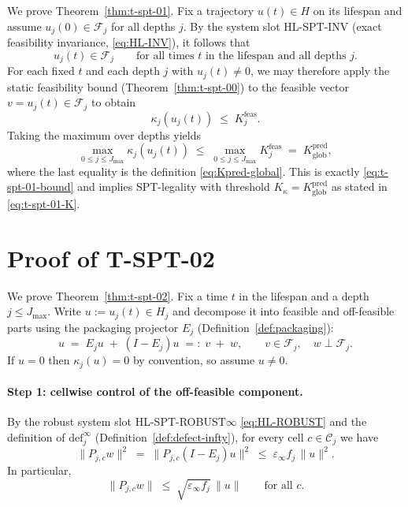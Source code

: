 \documentclass[11pt]{article}
\begin{document}
We prove Theorem~\ref{thm:t-spt-01}.
Fix a trajectory $u(t)\in H$ on its lifespan and assume $u_j(0)\in\mathcal{F}_j$ for all depths $j$.
By the system slot HL-SPT-INV (exact feasibility invariance, \eqref{eq:HL-INV}), it follows that
\[
u_j(t)\in \mathcal{F}_j \qquad \text{for all times $t$ in the lifespan and all depths $j$.}
\]
For each fixed $t$ and each depth $j$ with $u_j(t)\neq 0$, we may therefore apply the static feasibility bound (Theorem~\ref{thm:t-spt-00}) to the feasible vector $v=u_j(t)\in\mathcal{F}_j$ to obtain
\[
\kappa_j(u_j(t)) \;\le\; K^{\mathrm{feas}}_j.
\]
Taking the maximum over depths yields
\[
\max_{0\le j\le J_{\max}}\kappa_j(u_j(t))
\;\le\;
\max_{0\le j\le J_{\max}} K^{\mathrm{feas}}_j
\;=\;
K^{\mathrm{pred}}_{\mathrm{glob}},
\]
where the last equality is the definition \eqref{eq:Kpred-global}.
This is exactly \eqref{eq:t-spt-01-bound} and implies SPT-legality with threshold $K_\kappa=K^{\mathrm{pred}}_{\mathrm{glob}}$ as stated in \eqref{eq:t-spt-01-K}.
 \section{Proof of T-SPT-02}\label{sec:proof-t-spt-02}

We prove Theorem~\ref{thm:t-spt-02}.
Fix a time $t$ in the lifespan and a depth $j\le J_{\max}$.
Write $u:=u_j(t)\in H_j$ and decompose it into feasible and off-feasible parts using the packaging projector $E_j$ (Definition~\ref{def:packaging}):
\[
u \;=\; E_j u \;+\; (I-E_j)u \;=:\; v \;+\; w,
\qquad v\in\mathcal{F}_j,\quad w\perp \mathcal{F}_j.
\]
If $u=0$ then $\kappa_j(u)=0$ by convention, so assume $u\neq 0$.

\paragraph{Step 1: cellwise control of the off-feasible component.}
By the robust system slot HL-SPT-ROBUST$\infty$ \eqref{eq:HL-ROBUST} and the definition of $\mathrm{def}^\infty_j$ (Definition~\ref{def:defect-infty}),
for every cell $c\in\mathcal{C}_j$ we have
\begin{equation}\label{eq:proof-robust-cellwise}
\|P_{j,c}w\|^2
\;=\;
\|P_{j,c}(I-E_j)u\|^2
\;\le\;
\varepsilon_\infty f_j \,\|u\|^2.
\end{equation}
In particular,
\begin{equation}\label{eq:proof-robust-cellwise-sqrt}
\|P_{j,c}w\|
\;\le\;
\sqrt{\varepsilon_\infty f_j}\,\|u\|
\qquad \text{for all } c.
\end{equation}
\end{document}
